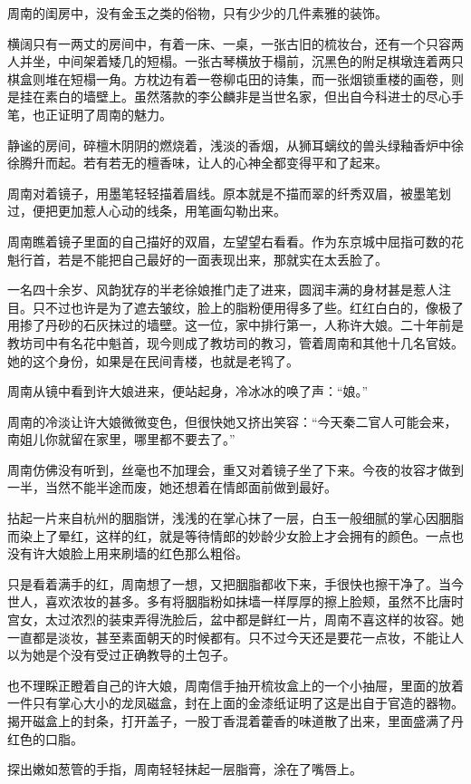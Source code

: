 周南的闺房中，没有金玉之类的俗物，只有少少的几件素雅的装饰。

横阔只有一两丈的房间中，有着一床、一桌，一张古旧的梳妆台，还有一个只容两人并坐，中间架着矮几的短榻。一张古琴横放于榻前，沉黑色的附足棋墩连着两只棋盒则堆在短榻一角。方枕边有着一卷柳屯田的诗集，而一张烟锁重楼的画卷，则是挂在素白的墙壁上。虽然落款的李公麟非是当世名家，但出自今科进士的尽心手笔，也正证明了周南的魅力。

静谧的房间，碎檀木阴阴的燃烧着，浅淡的香烟，从狮耳螭纹的兽头绿釉香炉中徐徐腾升而起。若有若无的檀香味，让人的心神全都变得平和了起来。

周南对着镜子，用墨笔轻轻描着眉线。原本就是不描而翠的纤秀双眉，被墨笔划过，便把更加惹人心动的线条，用笔画勾勒出来。

周南瞧着镜子里面的自己描好的双眉，左望望右看看。作为东京城中屈指可数的花魁行首，若是不能把自己最好的一面表现出来，那就实在太丢脸了。

一名四十余岁、风韵犹存的半老徐娘推门走了进来，圆润丰满的身材甚是惹人注目。只不过也许是为了遮去皱纹，脸上的脂粉便用得多了些。红红白白的，像极了用掺了丹砂的石灰抹过的墙壁。这一位，家中排行第一，人称许大娘。二十年前是教坊司中有名花中魁首，现今则成了教坊司的教习，管着周南和其他十几名官妓。她的这个身份，如果是在民间青楼，也就是老鸨了。

周南从镜中看到许大娘进来，便站起身，冷冰冰的唤了声：“娘。”

周南的冷淡让许大娘微微变色，但很快她又挤出笑容：“今天秦二官人可能会来，南姐儿你就留在家里，哪里都不要去了。”

周南仿佛没有听到，丝毫也不加理会，重又对着镜子坐了下来。今夜的妆容才做到一半，当然不能半途而废，她还想着在情郎面前做到最好。

拈起一片来自杭州的胭脂饼，浅浅的在掌心抹了一层，白玉一般细腻的掌心因胭脂而染上了晕红，这样的红，就是等待情郎的妙龄少女脸上才会拥有的颜色。一点也没有许大娘脸上用来刷墙的红色那么粗俗。

只是看着满手的红，周南想了一想，又把胭脂都收下来，手很快也擦干净了。当今世人，喜欢浓妆的甚多。多有将胭脂粉如抹墙一样厚厚的擦上脸颊，虽然不比唐时宫女，太过浓烈的装束弄得洗脸后，盆中都是鲜红一片，周南不喜这样的妆容。她一直都是淡妆，甚至素面朝天的时候都有。只不过今天还是要花一点妆，不能让人以为她是个没有受过正确教导的土包子。

也不理睬正瞪着自己的许大娘，周南信手抽开梳妆盒上的一个小抽屉，里面的放着一件只有掌心大小的龙凤磁盒，封在上面的金漆纸证明了这是出自于官造的器物。揭开磁盒上的封条，打开盖子，一股丁香混着藿香的味道散了出来，里面盛满了丹红色的口脂。

探出嫩如葱管的手指，周南轻轻抹起一层脂膏，涂在了嘴唇上。

